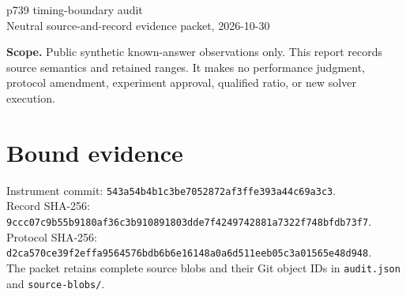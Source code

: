 \documentclass[10pt]{article}
\begin{document}
\raggedright\sloppy
{\LARGE p739 timing-boundary audit}\\[4pt]
{\small Neutral source-and-record evidence packet, 2026-10-30}\par
\textbf{Scope.} Public synthetic known-answer observations only. This report records source semantics and retained ranges. It makes no performance judgment, protocol amendment, experiment approval, qualified ratio, or new solver execution.
\section*{Bound evidence}
Instrument commit: \texttt{543a54b4b1c3be7052872af3ffe393a44c69a3c3}.\\
Record SHA-256: \texttt{9ccc07c9b55b9180af36c3b910891803dde7f4249742881a7322f748bfdb73f7}.\\
Protocol SHA-256: \texttt{d2ca570ce39f2effa9564576bdb6b6e16148a0a6d511eeb05c3a01565e48d948}.\\
The packet retains complete source blobs and their Git object IDs in \texttt{audit.json} and \texttt{source-blobs/}.
\end{document}

